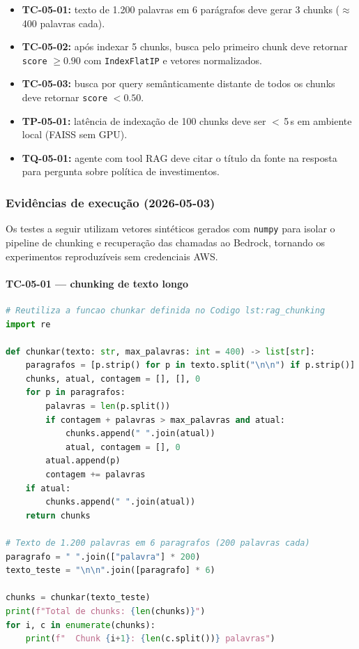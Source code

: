 \begin{itemize}[leftmargin=*]
  \item \textbf{TC-05-01:} texto de 1.200 palavras em 6 par\'agrafos
        deve gerar 3 chunks ($\approx$400 palavras cada).
  \item \textbf{TC-05-02:} ap\'os indexar 5 chunks, busca pelo
        primeiro chunk deve retornar \texttt{score} $\geq 0.90$ com
        \texttt{IndexFlatIP} e vetores normalizados.
  \item \textbf{TC-05-03:} busca por query sem\^anticamente distante
        de todos os chunks deve retornar \texttt{score} $< 0.50$.
  \item \textbf{TP-05-01:} latência de indexa\c{c}\~ao de 100 chunks
        deve ser $<$\,5\,s em ambiente local (FAISS sem GPU).
  \item \textbf{TQ-05-01:} agente com tool RAG deve citar o t\'itulo
        da fonte na resposta para pergunta sobre pol\'itica de
        investimentos.
\end{itemize}

\subsubsection*{Evid\^encias de execu\c{c}\~ao (2026-05-03)}

Os testes a seguir utilizam vetores sint\'eticos gerados com
\texttt{numpy} para isolar o pipeline de chunking e recupera\c{c}\~ao
das chamadas ao Bedrock, tornando os experimentos reproduz\'iveis
sem credenciais AWS.

\paragraph{TC-05-01 --- chunking de texto longo}

\begin{lstlisting}[language=Python,
      caption={TC-05-01 --- verifica\c{c}\~ao da fun\c{c}\~ao de chunking.},
      label={lst:cap5_tc0501_codigo}]
# Reutiliza a funcao chunkar definida no Codigo lst:rag_chunking
import re

def chunkar(texto: str, max_palavras: int = 400) -> list[str]:
    paragrafos = [p.strip() for p in texto.split("\n\n") if p.strip()]
    chunks, atual, contagem = [], [], 0
    for p in paragrafos:
        palavras = len(p.split())
        if contagem + palavras > max_palavras and atual:
            chunks.append(" ".join(atual))
            atual, contagem = [], 0
        atual.append(p)
        contagem += palavras
    if atual:
        chunks.append(" ".join(atual))
    return chunks

# Texto de 1.200 palavras em 6 paragrafos (200 palavras cada)
paragrafo = " ".join(["palavra"] * 200)
texto_teste = "\n\n".join([paragrafo] * 6)

chunks = chunkar(texto_teste)
print(f"Total de chunks: {len(chunks)}")
for i, c in enumerate(chunks):
    print(f"  Chunk {i+1}: {len(c.split())} palavras")
\end{lstlisting}

